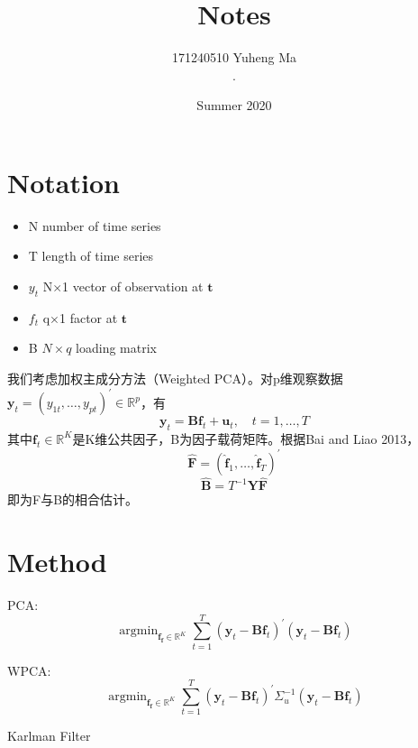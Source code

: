 \documentclass[10pt, oneside]{article}
\title{
Notes
}
\author{171240510 Yuheng Ma\\[0.3cm]{.}}
\date{Summer 2020}
\begin{document}
\maketitle

\vspace{.25in}

\section*{Notation}
\begin{itemize}
\item N number of time series
\item T length of time series
\item $y_t$ N$\times$1 vector of observation at $\mathbf{t}$
\item $f_t$ q$\times$1 factor at $\mathbf{t}$
\item B $N\times q$ loading matrix
\end{itemize}

我们考虑加权主成分方法（Weighted PCA）。对p维观察数据$\mathbf{y}_{t}=\left(y_{1 t}, \ldots, y_{p t}\right)^{\prime} \in \mathbb{R}^{p}$，有$$\mathbf{y}_{t}=\mathbf{B} \mathbf{f}_{t}+\mathbf{u}_{t}, \quad t=1, \ldots, T$$其中$\mathbf{f}_{t} \in \mathbb{R}^{K}$是K维公共因子，B为因子载荷矩阵。根据Bai and Liao 2013，$$\widehat{\mathbf{F}}=\left(\widehat{\mathbf{f}}_{1}, \ldots, \widehat{\mathbf{f}}_{T}\right)^{\prime}$$
$$\widehat{\mathbf{B}}=T^{-1} \mathbf{Y} \widehat{\mathbf{F}}$$
即为F与B的相合估计。

\section*{Method}
PCA:
\begin{equation}
\operatorname{argmin}_{\mathbf{f}_{\mathbf{f}} \in \mathbb{R}^{K}} \sum_{t=1}^{T}\left(\mathbf{y}_{t}-\mathbf{B f}_{t}\right)^{\prime}\left(\mathbf{y}_{t}-\mathbf{B} \mathbf{f}_{t}\right)
\end{equation}
\par
WPCA:
\begin{equation}
\operatorname{argmin}_{\mathbf{f}_{\mathbf{f}} \in \mathbb{R}^{K}} \sum_{t=1}^{T}\left(\mathbf{y}_{t}-\mathbf{B f}_{t}\right)^{\prime} \Sigma_{u}^{-1}\left(\mathbf{y}_{t}-\mathbf{B} \mathbf{f}_{t}\right)
\end{equation}

\par 
Karlman Filter

\end{document}
